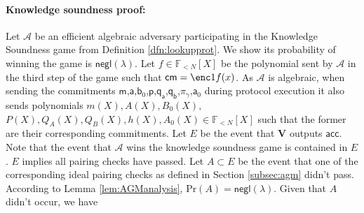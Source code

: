 \documentclass[11pt]{article} %
\newcommand{\F}{\ensuremath{\mathbb F}\xspace}
\newcommand{\adv}{\ensuremath{\mathcal A}\xspace}
\newcommand{\cm}{\ensuremath{\mathsf{cm}}\xspace}
\newcommand{\negl}{\ensuremath{\mathsf{negl}(\lambda)}\xspace}
\newcommand{\acc}{\ensuremath{\mathsf{acc}}\xspace}
\newcommand{\ver}{\ensuremath{\mathsf{\mathbf{V}}}\xspace}
\newcommand{\polysofdeg}[1]{\ensuremath{\F_{< #1}[X]}\xspace}
\newcommand{\prob}{\ensuremath{\mathrm{Pr}}\xspace}
\newcommand{\tabsize}{\ensuremath{N}\xspace}
\renewcommand{\a}{\ensuremath{\mathsf{a}}\xspace}
\renewcommand{\b}{\ensuremath{\mathsf{b}_0}\xspace}
\renewcommand{\p}{\ensuremath{\mathsf{p}}\xspace}
\newcommand{\qa}{\ensuremath{\mathsf{q_a}}\xspace}
\newcommand{\qb}{\ensuremath{\mathsf{q_b}}\xspace}
\newcommand{\m}{\ensuremath{\mathsf{m}}\xspace}
\newcommand{\gamproof}{\ensuremath{\mathsf{\pi_\gamma}}\xspace}
\newcommand{\zerproof}{\ensuremath{\mathsf{\a}_0}\xspace}
\begin{document}
\paragraph{Knowledge soundness proof:}
Let \adv be an efficient algebraic adversary participating in the Knowledge Soundness game from
Definition \ref{dfn:lookupprot}.
We show its probability of winning the game is \negl.
Let $f\in \polysofdeg{\tabsize}$ be the polynomial sent by \adv in the third step of the game
such that $\cm=\enc1{f(x)}$.
As \adv is algebraic, when sending the commitments \m,\a,\b,\p,\qa,\qb,\gamproof,\zerproof during protocol execution it also sends polynomials $m(X),A(X),B_0(X),$ $P(X),Q_A(X),Q_B(X),h(X),A_0(X)\in \polysofdeg{\tabsize}$ such that the former are their corresponding commitments.
Let $E$ be the event that \ver outputs \acc.
Note that the event that \adv wins the knowledge soundness game is contained in $E$. 
$E$ implies all pairing checks have passed.
Let $A\subset E$ be the event that one of the corresponding ideal pairing checks as defined in Section \ref{subsec:agm} didn't pass.
According to Lemma \ref{lem:AGManalysis}, $\prob(A)=\negl$.
Given that $A$ didn't occur, we have
\end{document}
